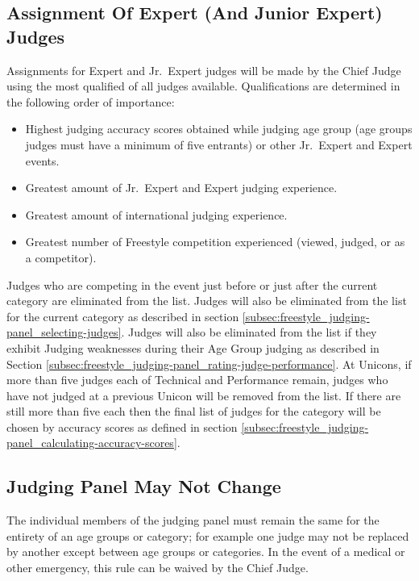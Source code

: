 \subsection{Assignment Of Expert (And Junior Expert) Judges \label{subsec:freestyle_judging-panel_assignment-of-expert-judges}} %
Assignments for Expert and Jr.~Expert judges will be made by the Chief Judge using the most qualified of all judges available.
Qualifications are determined in the following order of importance:
\begin{itemize}
\item Highest judging accuracy scores obtained while judging age group (age groups judges must have a minimum of five entrants) or other Jr.~Expert and Expert events.
\item Greatest amount of Jr.~Expert and Expert judging experience.
\item Greatest amount of international judging experience.
\item Greatest number of Freestyle competition experienced (viewed, judged, or as a competitor).
\end{itemize}
Judges who are competing in the event just before or just after the current category are eliminated from the list.
Judges will also be eliminated from the list for the current category as described in section \ref{subsec:freestyle_judging-panel_selecting-judges}.
Judges will also be eliminated from the list if they exhibit Judging weaknesses during their Age Group judging as described in Section \ref{subsec:freestyle_judging-panel_rating-judge-performance}.
At Unicons, if more than five judges each of Technical and Performance remain, judges who have not judged at a previous Unicon will be removed from the list.
If there are still more than five each then the final list of judges for the category will be chosen by accuracy scores as defined in section \ref{subsec:freestyle_judging-panel_calculating-accuracy-scores}.

\subsection{Judging Panel May Not Change}
The individual members of the judging panel must remain the same for the entirety of an age groups or category; for example one judge may not be replaced by another except between age groups or categories.
In the event of a medical or other emergency, this rule can be waived by the Chief Judge.

